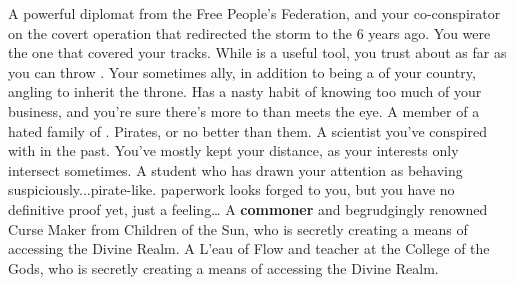 \documentclass[char]{GL2020}
\begin{document}
\begin{contacts}
	\contact{\cDiplomat{}} A powerful diplomat from the Free People's Federation, and your co-conspirator on the covert operation that redirected the storm to the \pShip{} 6 years ago. You were the one that covered your tracks. While \cDiplomat{\they} is a useful tool, you trust \cDiplomat{\them} about as far as you can throw \cDiplomat{\them}.
	\contact{\cPrince{}} Your sometimes ally, in addition to being a \cPrince{\Heir} of your country, angling to inherit the throne. 
	\contact{\cInterpol{}} Has a nasty habit of knowing too much of your business, and you're sure there's more to \cInterpol{\them} than meets the eye.
	\contact{\cJuniorStatesman{}} A member of a hated family of \pShippies{}. Pirates, or no better than them.
	\contact{\cHeadScientist{}} A scientist you've conspired with in the past. You've mostly kept your distance, as your interests only intersect sometimes.
	\contact{\cPirateChild{}} A student who has drawn your attention as behaving suspiciously...pirate-like. \cPirateChild{\Their} paperwork looks forged to you, but you have no definitive proof yet, just a feeling\ldots
	\contact{\cCurse{}} A \textbf{commoner} and begrudgingly renowned Curse Maker from Children of the Sun, who is secretly creating a means of accessing the Divine Realm.
	\contact{\cFlowPriest{}} A L'eau \cFlowPriest{\cleric} of Flow and teacher at the College of the Gods, who is secretly creating a means of accessing the Divine Realm.
\end{contacts}
\end{document}
